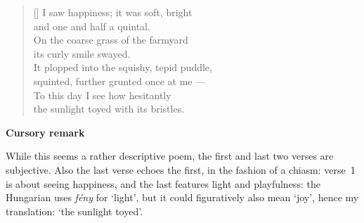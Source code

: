 \documentclass[a4paper,12pt,twoside,final]{book}
\begin{document}
\newpage


\settowidth{\versewidth}{It plopped into the squishy, tepid puddle,}

\begin{verse}[\versewidth]
  I saw happiness; it was soft, bright \\
  and one and half a quintal. \\
  On the coarse grass of the farmyard \\
  its curly smile swayed. \\
  It plopped into the squishy, tepid puddle, \\
  squinted, further grunted once at me --- \\
  To this day I see how hesitantly \\
  the sunlight toyed with its bristles. \\
\end{verse}


\bigskip

\noindent \textbf{Cursory remark}

\medskip

While this seems a rather descriptive poem, the first and last two
verses are subjective. Also the last verse echoes the first, in the
fashion of a chiasm: verse~1 is about seeing happiness, and the last
features light and playfulness: the Hungarian uses \emph{fény} for
`light', but it could figuratively also mean `joy', hence my
translation: `the sunlight toyed'.

\newpage

\settowidth{\versewidth}{hunyorgott, röffent még felém ---}
\end{document}
